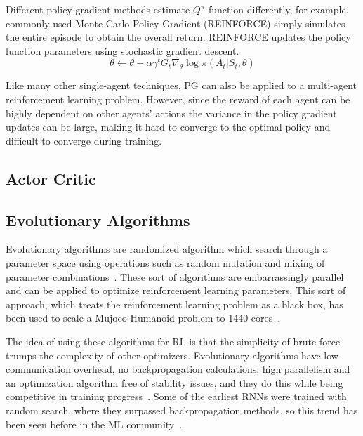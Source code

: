 Different policy gradient methods estimate $Q^\pi$ function differently, for
example, commonly used Monte-Carlo Policy Gradient (REINFORCE) simply
simulates the entire episode to obtain the overall return. REINFORCE updates
the policy function parameters using stochastic gradient descent.
\begin{equation}
\theta \leftarrow \theta
	+ \alpha \gamma^t G_t \nabla_\theta \log \pi (A_t|S_t, \theta)
\end{equation}

Like many other single-agent techniques, PG can also be applied to a
multi-agent reinforcement learning problem. However, since the reward of each
agent can be highly dependent on other agents' actions the variance in the
policy gradient updates can be large, making it hard to converge to the
optimal policy and difficult to converge during training.


\subsection{Actor Critic}






\subsection{Evolutionary Algorithms}

Evolutionary algorithms are randomized algorithm which search through a
parameter space using operations such as random mutation and mixing of
parameter combinations~\cite{man1996genetic}. These sort of algorithms are
embarrassingly parallel and can be applied to optimize reinforcement learning
parameters. This sort of approach, which treats the reinforcement learning
problem as a black box, has been used to scale a Mujoco Humanoid problem to
1440 cores~\cite{salimans2017evolution}.

The idea of using these algorithms for RL is that the simplicity of brute
force trumps the complexity of other optimizers. Evolutionary algorithms have
low communication overhead, no backpropagation calculations, high parallelism
and an optimization algorithm free of stability issues, and they do this while
being competitive in training progress~\cite{salimans2017evolution}. Some of
the earliest RNNs were trained with random search, where they surpassed
backpropagation methods, so this trend has been seen before in the ML
community~\cite{hochreiter1997long}.

